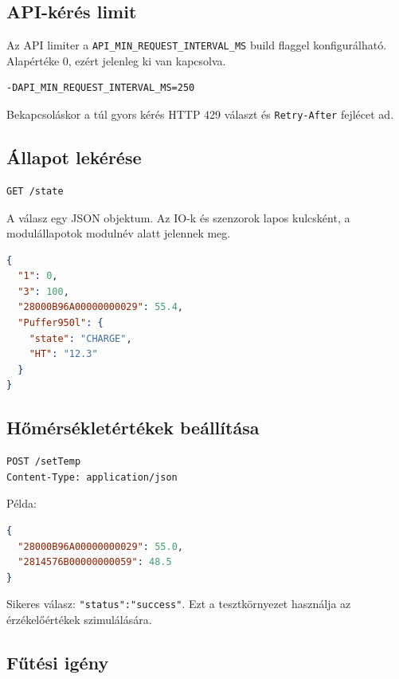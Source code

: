 \documentclass[11pt,a4paper]{article}
\begin{document}
\subsection{API-kérés limit}

Az API limiter a \texttt{API\_MIN\_REQUEST\_INTERVAL\_MS} build flaggel konfigurálható. Alapértéke 0, ezért jelenleg ki van kapcsolva.

\begin{lstlisting}
-DAPI_MIN_REQUEST_INTERVAL_MS=250
\end{lstlisting}

Bekapcsoláskor a túl gyors kérés HTTP 429 választ és \texttt{Retry-After} fejlécet ad.

\subsection{Állapot lekérése}

\begin{lstlisting}
GET /state
\end{lstlisting}

A válasz egy JSON objektum. Az IO-k és szenzorok lapos kulcsként, a modulállapotok modulnév alatt jelennek meg.

\begin{lstlisting}[language=json]
{
  "1": 0,
  "3": 100,
  "28000B96A00000000029": 55.4,
  "Puffer950l": {
    "state": "CHARGE",
    "HT": "12.3"
  }
}
\end{lstlisting}

\subsection{Hőmérsékletértékek beállítása}

\begin{lstlisting}
POST /setTemp
Content-Type: application/json
\end{lstlisting}

Példa:

\begin{lstlisting}[language=json]
{
  "28000B96A00000000029": 55.0,
  "2814576B00000000059": 48.5
}
\end{lstlisting}

Sikeres válasz: \texttt{"status":"success"}. Ezt a tesztkörnyezet használja az érzékelőértékek szimulálására.

\subsection{Fűtési igény}
\end{document}
